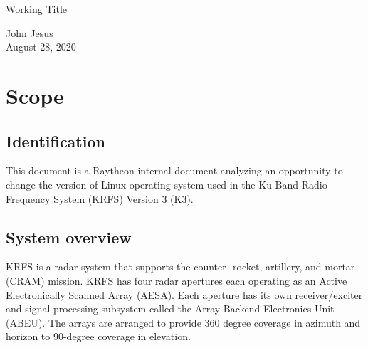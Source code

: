 \documentclass[12pt]{article}
\begin{document}
\thispagestyle{empty}
\begin{titlepage}
\begin{center}
        \vspace*{1cm}

        \LARGE{Working Title}

        \vspace{0.5cm}
        \LARGE

        \vspace{1.5cm}

        \normalsize

        John Jesus \\
        August 28, 2020

        \vfill



        \vspace{0.8cm}




\end{center}
\end{titlepage}

\tableofcontents

%
\newpage
\section{Scope}
\subsection{Identification}
This document is a Raytheon internal document analyzing an opportunity to change
the version of Linux operating system used in the Ku Band Radio Frequency System
(KRFS) Version 3 (K3).

\subsection{System overview}
KRFS is a radar system that supports the counter- rocket, artillery, and mortar
(CRAM) mission.  KRFS has four radar apertures each operating as an Active
Electronically Scanned Array (AESA).  Each aperture has its own receiver/exciter
and signal processing subsystem called the Array Backend Electronics Unit
(ABEU).  The arrays are arranged to provide 360 degree coverage in azimuth and
horizon to 90-degree coverage in elevation.
\end{document}
